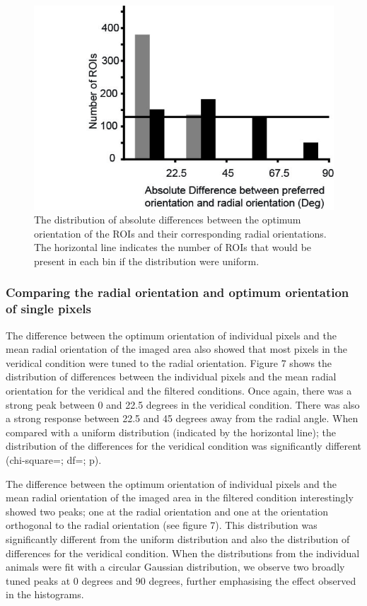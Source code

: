 			
			\begin{figure}
				
				\includegraphics[width=\linewidth]{rb/roi_hist.jpg}
				\caption{The distribution of absolute differences between the optimum orientation of the ROIs and their corresponding radial orientations. The horizontal line indicates the number of ROIs that would be present in each bin if the distribution were uniform.}
				\label{fig:fig6}
			\end{figure}
		\subsubsection{Comparing the radial orientation and optimum orientation of single pixels}
			The difference between the optimum orientation of individual pixels and the mean radial orientation of the imaged area also showed that most pixels in the veridical condition were tuned to the radial orientation. Figure 7 shows the distribution of differences between the individual pixels and the mean radial orientation for the veridical and the filtered conditions. Once again, there was a strong peak between 0 and 22.5 degrees in the veridical condition. There was also a strong response between 22.5 and 45 degrees away from the radial angle. When compared with a uniform distribution (indicated by the horizontal line); the distribution of the differences for the veridical condition was significantly different (chi-square=; df=; p).
			
			
			The difference between the optimum orientation of individual pixels and the mean radial orientation of the imaged area in the filtered condition interestingly showed two peaks; one at the radial orientation and one at the orientation orthogonal to the radial orientation (see figure 7). This distribution was significantly different from the uniform distribution and also the distribution of differences for the veridical condition. When the distributions from the individual animals were fit  with a circular Gaussian distribution, we observe two broadly tuned peaks at 0 degrees and 90 degrees, further emphasising the effect observed in the histograms.
			
